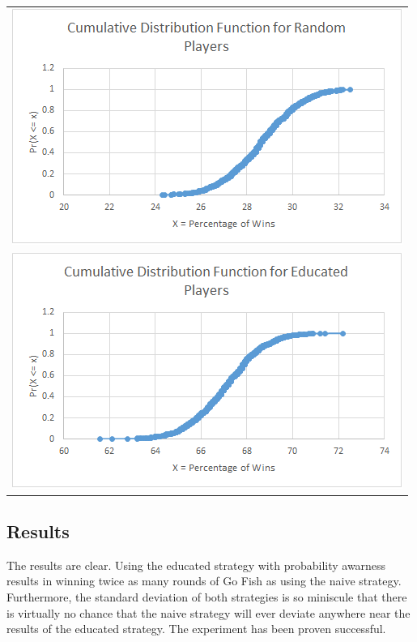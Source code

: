 \documentclass[preprint,12pt]{elsarticle}
\begin{document}
\begin{center}
	\begin{tabular}{c}
		\includegraphics[scale=1]{../images/CDF_chart_random.png} \\ \includegraphics[scale=1]{../images/CDF_chart_educated.png} \\
	\end{tabular}



\end{center}

\subsection{Results}

The results are clear. Using the educated strategy with probability awarness results in winning twice as many rounds of Go Fish as using the naive strategy. Furthermore, the standard deviation of both strategies is so miniscule that there is virtually no chance that the naive strategy will ever deviate anywhere near the results of the educated strategy. The experiment has been proven successful.
\end{document}

